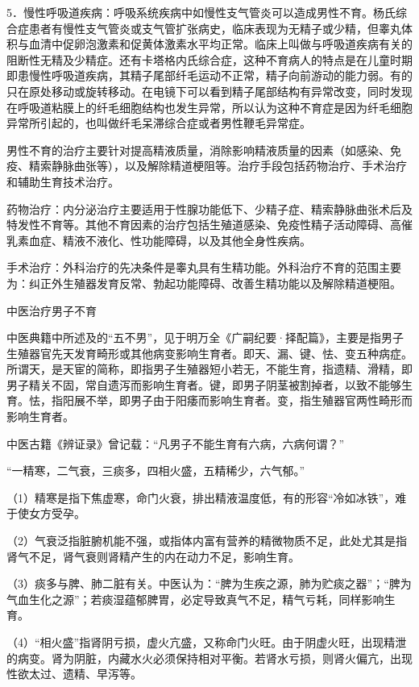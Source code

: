 \documentclass[12pt,UTF8]{ctexbook}
\begin{document}
5．慢性呼吸道疾病：呼吸系统疾病中如慢性支气管炎可以造成男性不育。杨氏综合症患者有慢性支气管炎或支气管扩张病史，临床表现为无精子或少精，但睾丸体积与血清中促卵泡激素和促黄体激素水平均正常。临床上叫做与呼吸道疾病有关的阻断性无精及少精症。还有卡塔格内氏综合症，这种不育病人的特点是在儿童时期即患慢性呼吸道疾病，其精子尾部纤毛运动不正常，精子向前游动的能力弱。有的只在原处移动或旋转移动。在电镜下可以看到精子尾部结构有异常改变，同时发现在呼吸道粘膜上的纤毛细胞结构也发生异常，所以认为这种不育症是因为纤毛细胞异常所引起的，也叫做纤毛呆滞综合症或者男性鞭毛异常症。

男性不育的治疗主要针对提高精液质量，消除影响精液质量的因素（如感染、免疫、精索静脉曲张等），以及解除精道梗阻等。治疗手段包括药物治疗、手术治疗和辅助生育技术治疗。

药物治疗：内分泌治疗主要适用于性腺功能低下、少精子症、精索静脉曲张术后及特发性不育等。其他不育因素的治疗包括生殖道感染、免疫性精子活动障碍、高催乳素血症、精液不液化、性功能障碍，以及其他全身性疾病。

手术治疗：外科治疗的先决条件是睾丸具有生精功能。外科治疗不育的范围主要为：纠正外生殖器发育反常、勃起功能障碍、改善生精功能以及解除精道梗阻。





中医治疗男子不育


中医典籍中所述及的“五不男”，见于明万全《广嗣纪要·择配篇》，主要是指男子生殖器官先天发育畸形或其他病变影响生育者。即天、漏、键、怯、变五种病症。所谓天，是天宦的简称，即指男子生殖器短小若无，不能生育，指遗精、滑精，即男子精关不固，常自遗泻而影响生育者。键，即男子阴茎被割掉者，以致不能够生育。怯，指阳展不举，即男子由于阳痿而影响生育者。变，指生殖器官两性畸形而影响生育者。

中医古籍《辨证录》曾记载：“凡男子不能生育有六病，六病何谓？”

“一精寒，二气衰，三痰多，四相火盛，五精稀少，六气郁。”

（1）精寒是指下焦虚寒，命门火衰，排出精液温度低，有的形容“冷如冰铁”，难于使女方受孕。

（2）气衰泛指脏腑机能不强，或指体内富有营养的精微物质不足，此处尤其是指肾气不足，肾气衰则肾精产生的内在动力不足，影响生育。

（3）痰多与脾、肺二脏有关。中医认为：“脾为生疾之源，肺为贮痰之器”；“脾为气血生化之源”；若痰湿蕴郁脾胃，必定导致真气不足，精气亏耗，同样影响生育。

（4）“相火盛”指肾阴亏损，虚火亢盛，又称命门火旺。由于阴虚火旺，出现精泄的病变。肾为阴脏，内藏水火必须保持相对平衡。若肾水亏损，则肾火偏亢，出现性欲太过、遗精、早泻等。
\end{document}
